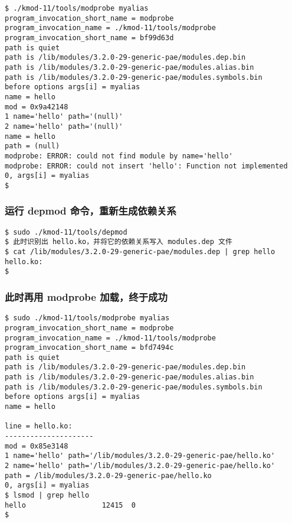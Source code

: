 \documentclass[11pt,a4paper]{article}
\begin{document}
{\begin{shaded}\begin{verbatim}
$ ./kmod-11/tools/modprobe myalias
program_invocation_short_name = modprobe
program_invocation_name = ./kmod-11/tools/modprobe
program_invocation_short_name = bf99d63d
path is quiet
path is /lib/modules/3.2.0-29-generic-pae/modules.dep.bin
path is /lib/modules/3.2.0-29-generic-pae/modules.alias.bin
path is /lib/modules/3.2.0-29-generic-pae/modules.symbols.bin
before options args[i] = myalias
name = hello
mod = 0x9a42148
1 name='hello' path='(null)'
2 name='hello' path='(null)'
name = hello
path = (null)
modprobe: ERROR: could not find module by name='hello'
modprobe: ERROR: could not insert 'hello': Function not implemented
0, args[i] = myalias
$ 
\end{verbatim}\end{shaded}}
\subsubsection{运行 depmod 命令，重新生成依赖关系}

{\begin{shaded}\begin{verbatim}
$ sudo ./kmod-11/tools/depmod 
$ 此时识别出 hello.ko，并将它的依赖关系写入 modules.dep 文件
$ cat /lib/modules/3.2.0-29-generic-pae/modules.dep | grep hello
hello.ko:
$ 
\end{verbatim}\end{shaded}}
\subsubsection{此时再用 modprobe 加载，终于成功}

{\begin{shaded}\begin{verbatim}
$ sudo ./kmod-11/tools/modprobe myalias
program_invocation_short_name = modprobe
program_invocation_name = ./kmod-11/tools/modprobe
program_invocation_short_name = bfd7494c
path is quiet
path is /lib/modules/3.2.0-29-generic-pae/modules.dep.bin
path is /lib/modules/3.2.0-29-generic-pae/modules.alias.bin
path is /lib/modules/3.2.0-29-generic-pae/modules.symbols.bin
before options args[i] = myalias
name = hello

line = hello.ko:
---------------------
mod = 0x85e3148
1 name='hello' path='/lib/modules/3.2.0-29-generic-pae/hello.ko'
2 name='hello' path='/lib/modules/3.2.0-29-generic-pae/hello.ko'
path = /lib/modules/3.2.0-29-generic-pae/hello.ko
0, args[i] = myalias
$ lsmod | grep hello
hello                  12415  0 
$ 
\end{verbatim}\end{shaded}}
\end{document}
